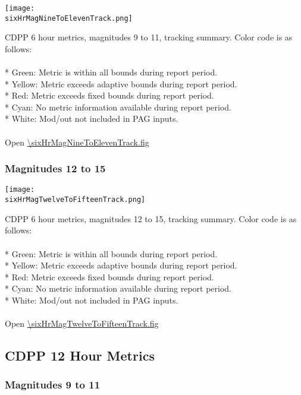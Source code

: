 \begin{center}
\texttt{[image: \\sixHrMagNineToElevenTrack.png]}
\end{center}
CDPP 6 hour metrics, magnitudes 9 to 11, tracking summary. Color code is as follows:\\
\\
* Green: Metric is within all bounds during report period.\\
* Yellow: Metric exceeds adaptive bounds during report period.\\
* Red: Metric exceeds fixed bounds during report period.\\
* Cyan: No metric information available during report period.\\
* White: Mod/out not included in PAG inputs.\\
\\
Open \url{\sixHrMagNineToElevenTrack.fig}

\newpage

\subsubsection{Magnitudes 12 to 15}

\begin{center}
\texttt{[image: \\sixHrMagTwelveToFifteenTrack.png]}
\end{center}
CDPP 6 hour metrics, magnitudes 12 to 15, tracking summary. Color code is as follows:\\
\\
* Green: Metric is within all bounds during report period.\\
* Yellow: Metric exceeds adaptive bounds during report period.\\
* Red: Metric exceeds fixed bounds during report period.\\
* Cyan: No metric information available during report period.\\
* White: Mod/out not included in PAG inputs.\\
\\
Open \url{\sixHrMagTwelveToFifteenTrack.fig}

\newpage

\subsection{CDPP 12 Hour Metrics}

\subsubsection{Magnitudes 9 to 11}

